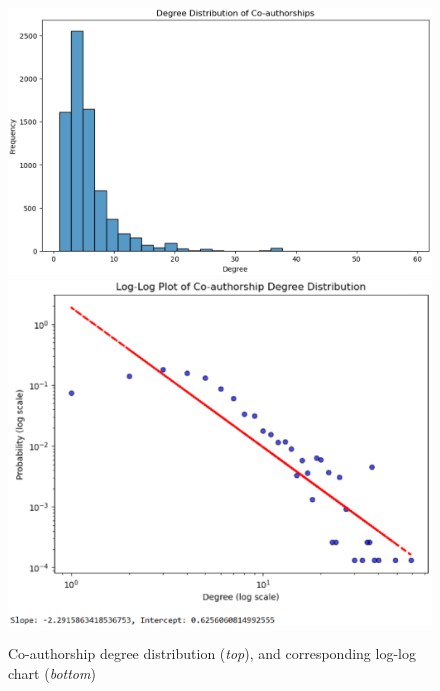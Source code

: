 \documentclass[a4paper, review, endfloat, doubleblind, authoryear]{elsarticle}
\begin{document}
	\begin{figure}[htbp]
		\centering
		\includegraphics[height=0.2\textheight, keepaspectratio]{pics/coauthorship_degree_distribution.eps}
		\includegraphics[height=0.2\textheight, keepaspectratio]{pics/coauthorship_degree_distribution_loglog_chart.eps}
		\caption{Co-authorship degree distribution (\textit{top}), and corresponding log-log chart (\textit{bottom})}\label{fig:fig3}
	\end{figure}
	
\end{document}
